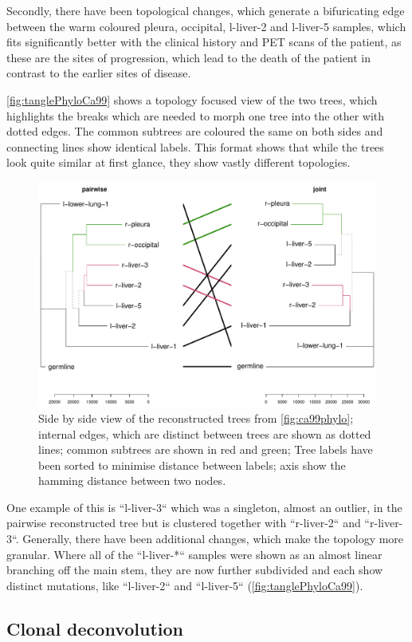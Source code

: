Secondly, there have been topological changes, which generate a bifuricating edge between the warm coloured pleura, occipital, l-liver-2 and l-liver-5 samples, which fits significantly better with the clinical history and PET scans of the patient, as these are the sites of progression, which lead to the death of the patient in contrast to the earlier sites of disease.

\autoref{fig:tanglePhyloCa99} shows a topology focused view of the two trees, which highlights the breaks which are needed to morph one tree into the other with dotted edges. The common subtrees are coloured the same on both sides and connecting lines show identical labels. This format shows that while the trees look quite similar at first glance, they show vastly different topologies.

\begin{figure}[!ht]
\centering
\includegraphics[width=.99\linewidth]{Figures/tanglePhyloCA99.pdf}
\caption[Tanglegram of the reconstructed phylogenies]{Side by side view of the reconstructed trees from \autoref{fig:ca99phylo}; internal edges, which are distinct between trees are shown as dotted lines; common subtrees are shown in red and green; Tree labels have been sorted to minimise distance between labels; axis show the hamming distance between two nodes.}\label{fig:tanglePhyloCa99}
\end{figure}

One example of this is ``l-liver-3`` which was a singleton, almost an outlier, in the pairwise reconstructed tree but is clustered together with ``r-liver-2`` and ``r-liver-3``. Generally, there have been additional changes, which make the topology more granular. Where all of the ``l-liver-*`` samples were shown as an almost linear branching off the main stem, they are now further subdivided and each show distinct mutations, like ``l-liver-2`` and ``l-liver-5`` (\autoref{fig:tanglePhyloCa99}).



\subsection[Clonal deconvolution]{Clonal deconvolution}
\label{variantcalling-sec:clonal}

